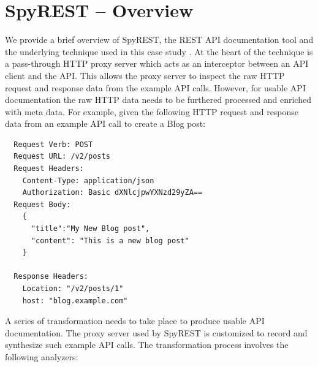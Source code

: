 \documentclass[10pt, conference]{IEEEtran}
\begin{document}
\section{SpyREST -- Overview} %
\label{sec:overview}
We provide a brief overview of SpyREST, the REST API documentation tool and the underlying technique used in this case study \cite{DBLP:conf/kbse/SohanAM15, DBLP:conf/kbse/SohanAM15a}. At the heart of the technique is a pass-through HTTP proxy server which acts as an interceptor between an API client and the API. This allows the proxy server to inspect the raw HTTP request and response data from the example API calls. However, for usable API documentation the raw HTTP data needs to be furthered processed and enriched with meta data. For example, given the following HTTP request and response data from an example API call to create a Blog post:
\begin{lstlisting}
  Request Verb: POST
  Request URL: /v2/posts
  Request Headers:
    Content-Type: application/json
    Authorization: Basic dXNlcjpwYXNzd29yZA==
  Request Body:
    {
      "title":"My New Blog post",
      "content": "This is a new blog post"
    }

  Response Headers:
    Location: "/v2/posts/1"
    host: "blog.example.com"

\end{lstlisting}

A series of transformation needs to take place to produce usable API documentation. The proxy server used by SpyREST is customized to record and synthesize such example API calls. The transformation process involves the following analyzers:
\end{document}
